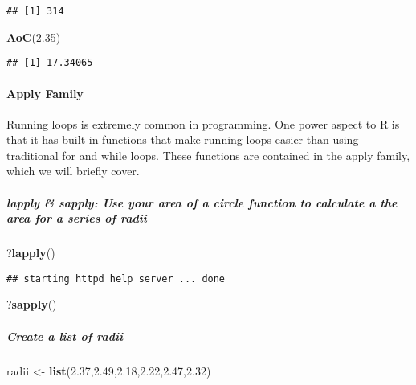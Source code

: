 \documentclass[]{article}
\newenvironment{Shaded}{\begin{snugshade}}{\end{snugshade}}
\newcommand{\KeywordTok}[1]{\textcolor[rgb]{0.13,0.29,0.53}{\textbf{#1}}}
\newcommand{\FloatTok}[1]{\textcolor[rgb]{0.00,0.00,0.81}{#1}}
\newcommand{\StringTok}[1]{\textcolor[rgb]{0.31,0.60,0.02}{#1}}
\newcommand{\NormalTok}[1]{#1}
\let\oldparagraph\paragraph
\renewcommand{\paragraph}[1]{\oldparagraph{#1}\mbox{}}
\let\oldsubparagraph\subparagraph
\renewcommand{\subparagraph}[1]{\oldsubparagraph{#1}\mbox{}}
\begin{document}
\begin{verbatim}
## [1] 314
\end{verbatim}

\begin{Shaded}
\begin{Highlighting}[]
\KeywordTok{AoC}\NormalTok{(}\FloatTok{2.35}\NormalTok{)}
\end{Highlighting}
\end{Shaded}

\begin{verbatim}
## [1] 17.34065
\end{verbatim}

\paragraph{Apply Family}\label{apply-family}

Running loops is extremely common in programming. One power aspect to R
is that it has built in functions that make running loops easier than
using traditional for and while loops. These functions are contained in
the apply family, which we will briefly cover.

\subparagraph{lapply \& sapply: Use your area of a circle function to
calculate a the area for a series of
radii}\label{lapply-sapply-use-your-area-of-a-circle-function-to-calculate-a-the-area-for-a-series-of-radii}

\begin{Shaded}
\begin{Highlighting}[]
\NormalTok{?}\KeywordTok{lapply}\NormalTok{()}
\end{Highlighting}
\end{Shaded}

\begin{verbatim}
## starting httpd help server ... done
\end{verbatim}

\begin{Shaded}
\begin{Highlighting}[]
\NormalTok{?}\KeywordTok{sapply}\NormalTok{()}
\end{Highlighting}
\end{Shaded}

\subparagraph{Create a list of radii}\label{create-a-list-of-radii}

\begin{Shaded}
\begin{Highlighting}[]
\NormalTok{radii <-}\StringTok{ }\KeywordTok{list}\NormalTok{(}\FloatTok{2.37}\NormalTok{,}\FloatTok{2.49}\NormalTok{,}\FloatTok{2.18}\NormalTok{,}\FloatTok{2.22}\NormalTok{,}\FloatTok{2.47}\NormalTok{,}\FloatTok{2.32}\NormalTok{)}
\end{Highlighting}
\end{Shaded}
\end{document}
